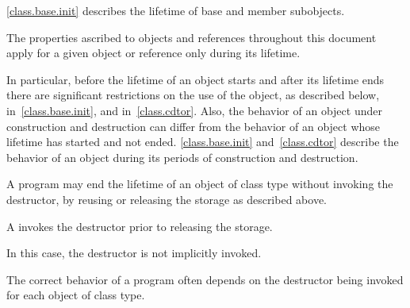 \pnum
\begin{note}
\ref{class.base.init}
describes the lifetime of base and member subobjects.
\end{note}

\pnum
The properties ascribed to objects and references throughout this document
apply for a given object or reference only during its lifetime.
\begin{note}
In particular, before the lifetime of an object starts and after its
lifetime ends there are significant restrictions on the use of the
object, as described below, in~\ref{class.base.init}, and
in~\ref{class.cdtor}. Also, the behavior of an object under construction
and destruction can differ from the behavior of an object whose
lifetime has started and not ended. \ref{class.base.init}
and~\ref{class.cdtor} describe the behavior of an object during its periods
of construction and destruction.
\end{note}

\pnum
A program may end the lifetime of an object of class type without invoking the
destructor, by reusing or releasing the storage as described above.
\begin{note}
A  invokes the destructor
prior to releasing the storage.
\end{note}
In this case, the destructor is not implicitly invoked.
\begin{note}
The correct behavior of a program often depends on
the destructor being invoked for each object of class type.
\end{note}

